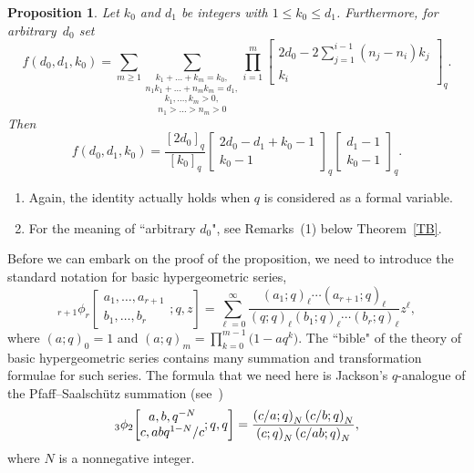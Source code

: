 \documentclass[pdftex]{sigma}
\newtheorem{Proposition}[Theorem]{Proposition}
 { \theoremstyle{definition}
\newtheorem{Definition}[Theorem]{Definition}
\newtheorem{Note}[Theorem]{Note}
\newtheorem{Example}[Theorem]{Example}
\newtheorem{Remark}[Theorem]{Remark}
\newtheorem*{Remarks}{Remarks} }
\def\poq#1#2{(#1;q)_#2}
\begin{document}
\begin{Proposition} \label{TC}
Let $k_0$ and $d_1$ be integers with $1\le k_0\le d_1$.
Furthermore, for arbitrary~$d_0$ set
\begin{equation} \label{AC}
f(d_0,d_1,k_0)=\sum_{m\ge1}
\underset{n_1>\dots>n_m>0}
{
\underset{k_1,\dots,k_m>0,}
{
\underset{n_1k_1+\dots+n_mk_m=d_1,}
{\sum_{k_1+\dots+k_m=k_0,}}}}
\prod_{i=1}^m \begin{bmatrix}
  2d_0-2\sum_{j=1}^{i-1}(n_j-n_i)k_j\\k_i\end{bmatrix}_q .
\end{equation}
Then
\begin{equation*}
f(d_0,d_1,k_0)=\frac {[2d_0]_q} {[k_0]_q}
\begin{bmatrix} 2d_0-d_1+k_0-1\\k_0-1\end{bmatrix}_q
\begin{bmatrix} d_1-1\\
k_0-1\end{bmatrix}_q.
\end{equation*}
\end{Proposition}

\begin{Remarks}\quad
\begin{enumerate}\itemsep=0pt
\item[(1)] Again, the identity actually holds when $q$ is considered as a
formal variable.

\item[(2)]
For the meaning of ``arbitrary $d_0$", see Remarks~(1) below
Theorem~\ref{TB}.
\end{enumerate}
\end{Remarks}

Before we can embark on the proof of the proposition, we need to
introduce the standard notation for basic hypergeometric series,
\begin{equation} \label{AH}
{}_{r+1}\phi_r\!\left[\begin{matrix} a_1,\dots,a_{r+1}\\
b_1,\dots,b_r\end{matrix}; q,z\right]
=\sum _{\ell=0} ^{\infty}\frac {\poq{a_1}{\ell}\cdots\poq{a_{r+1}}{\ell}}
{\poq{q}{\ell}\poq{b_1}{\ell}\cdots\poq{b_r}{\ell}}
z^\ell,
\end{equation}
where $(a;q)_0=1$ and $(a;q)_m=\prod_{k=0}^{m-1}\bigl(1-aq^k\bigr)$.
The ``bible" \cite{GaRaAF} of the theory of basic hypergeometric
series contains many summation and transformation formulae for such
series. The formula that we need here is Jackson's $q$-analogue
of the Pfaff--Saalsch\"utz summation
(see~\mbox{\cite[equation~(1.7.2); Appendix II.12]{GaRaAF}})
\begin{equation} \label{AE}
{}_3\phi _2\!\left [ \begin{matrix} \let\over/ a,b,{q^{-N}}\\ \let\over/  c,{{a b {q^{1 - N}}}/
   c}\end{matrix} ;q,q\right ] ={\frac {{(\let\over/ {c/ a};q)}_{N}\, {(\let\over/ {c/ b};q)}_{N}}
    {{(\let\over/ c;q)}_{N}\, {(\let\over/ {c\over {a b}};q)}_{N}}},
\end{equation}
where $N$ is a nonnegative integer.
\end{document}
